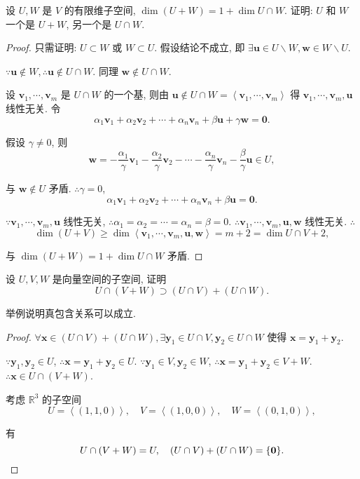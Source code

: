\documentclass[color=black,device=normal,lang=cn,mode=geye]{elegantnote}
\begin{document}
\begin{exercisec}[1.4.2]
    设 $U,W$ 是 $V$ 的有限维子空间, $\dim(U+W)=1+\dim U\cap W$. 证明: $U$ 和 $W$ 一个是 $U+W$, 另一个是 $U\cap W$.
\end{exercisec}
\begin{proof}
    只需证明: $U\subset W$ 或 $W\subset U$. 假设结论不成立, 即 $\exists\boldsymbol{u}\in U\backslash W,\boldsymbol{w}\in W\backslash U$.

    $\because\boldsymbol{u}\notin W,\therefore\boldsymbol{u}\notin U\cap W$. 同理 $\boldsymbol{w}\notin U\cap W$.

    设 $\boldsymbol{v}_1,\cdots,\boldsymbol{v}_m$ 是 $U\cap W$ 的一个基, 则由 $\boldsymbol{u}\notin U\cap W=\left<\boldsymbol{v}_1,\cdots,\boldsymbol{v}_m\right>$ 得 $\boldsymbol{v}_1,\cdots,\boldsymbol{v}_m,\boldsymbol{u}$ 线性无关. 令
    \[\alpha_1\boldsymbol{v}_1+\alpha_2\boldsymbol{v}_2+\cdots+\alpha_n\boldsymbol{v}_n+\beta\boldsymbol{u}+\gamma\boldsymbol{w}=\boldsymbol{0}.\]

    假设 $\gamma\neq0$, 则
    \[\boldsymbol{w}=-\dfrac{\alpha_1}{\gamma}\boldsymbol{v}_1-\dfrac{\alpha_2}{\gamma}\boldsymbol{v}_2-\cdots-\dfrac{\alpha_n}{\gamma}\boldsymbol{v}_n-\dfrac{\beta}{\gamma}\boldsymbol{u}\in U,\]

    与 $\boldsymbol{w}\notin U$ 矛盾. $\therefore\gamma=0$,
    \[\alpha_1\boldsymbol{v}_1+\alpha_2\boldsymbol{v}_2+\cdots+\alpha_n\boldsymbol{v}_n+\beta\boldsymbol{u}=\boldsymbol{0}.\]

    $\because\boldsymbol{v}_1,\cdots,\boldsymbol{v}_m,\boldsymbol{u}$ 线性无关, $\therefore\alpha_1=\alpha_2=\cdots=\alpha_n=\beta=0$. $\therefore\boldsymbol{v}_1,\cdots,\boldsymbol{v}_m,\boldsymbol{u},\boldsymbol{w}$ 线性无关. $\therefore$
    \[\dim(U+V)\geq\dim\left<\boldsymbol{v}_1,\cdots,\boldsymbol{v}_m,\boldsymbol{u},\boldsymbol{w}\right>=m+2=\dim U\cap V+2,\]

    与 $\dim(U+W)=1+\dim U\cap W$ 矛盾.
\end{proof}
\begin{exercisec}[1.4.4]\label{exc1.4.4}
    设 $U,V,W$ 是向量空间的子空间, 证明
    \[U\cap(V+W)\supset(U\cap V)+(U\cap W).\]

    举例说明真包含关系可以成立.
\end{exercisec}
\begin{proof}
    $\forall\boldsymbol{x}\in(U\cap V)+(U\cap W),\exists\boldsymbol{y}_1\in U\cap V,\boldsymbol{y}_2\in U\cap W$ 使得 $\boldsymbol{x}=\boldsymbol{y}_1+\boldsymbol{y}_2$.

    $\because\boldsymbol{y}_1,\boldsymbol{y}_2\in U$, $\therefore\boldsymbol{x}=\boldsymbol{y}_1+\boldsymbol{y}_2\in U$. $\because\boldsymbol{y}_1\in V,\boldsymbol{y}_2\in W$, $\therefore\boldsymbol{x}=\boldsymbol{y}_1+\boldsymbol{y}_2\in V+W$. $\therefore\boldsymbol{x}\in U\cap(V+W)$.

    考虑 $\mathbb{R}^3$ 的子空间
    \[U=\left<(1,1,0)\right>,\quad V=\left<(1,0,0)\right>,\quad W=\left<(0,1,0)\right>,\]

    有
    \[U\cap(V+W)=U,\quad(U\cap V)+(U\cap W)=\{\boldsymbol{0}\}.\qedhere\]
\end{proof}
\end{document}
